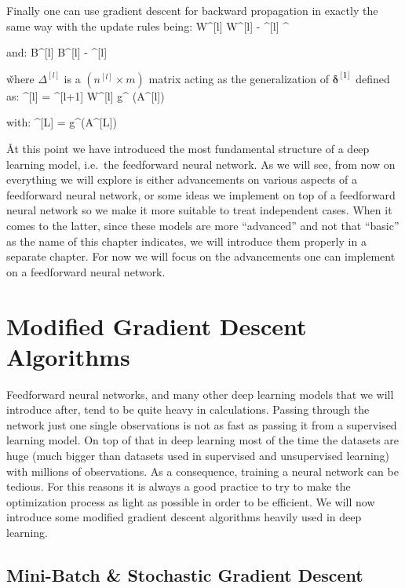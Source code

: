 Finally one can use gradient descent for backward propagation in exactly the same way with the update rules being:
\bse
W^{[l]} \coloneqq W^{[l]} - \alpha \cdot \Delta^{[l]} ^{\intercal}
\ese

and:
\bse
B^{[l]} \coloneqq B^{[l]} - \alpha \cdot \Delta^{[l]}
\ese

\v

where $\Delta^{[l]}$ is a $(n^{[l]} \times m)$ matrix acting as the generalization of $\boldsymbol{\delta^{[l]}}$
defined as:
\bse
\Delta^{[l]} = \Delta^{[l+1]} \cdot W^{[l]} \cdot g^{\prime} (A^{[l]})
\ese

with:
\bse
\Delta^{[L]} =  \cdot g^\prime (A^{[L]})
\ese

\v

At this point we have introduced the most fundamental structure of a deep learning model, i.e.\ the feedforward
neural network. As we will see, from now on everything we will explore is either advancements on various aspects of a
feedforward neural network, or some ideas we implement on top of a feedforward neural network so we make it more
suitable to treat independent cases. When it comes to the latter, since these models are more ``advanced'' and not
that ``basic'' as the name of this chapter indicates, we will introduce them properly in a separate chapter. For now
we will focus on the advancements one can implement on a feedforward neural network.

\section{Modified Gradient Descent Algorithms}

Feedforward neural networks, and many other deep learning models that we will introduce after, tend to be quite heavy
in calculations. Passing through the network just one single observations is not as fast as passing it from a
supervised learning model. On top of that in deep learning most of the time the datasets are huge (much bigger than
datasets used in supervised and unsupervised learning) with millions of observations. As a consequence, training a
neural network can be tedious. For this reasons it is always a good practice to try to make the optimization process
as light as possible in order to be efficient. We will now introduce some modified gradient descent algorithms
heavily used in deep learning.

\subsection{Mini-Batch \& Stochastic Gradient Descent}

